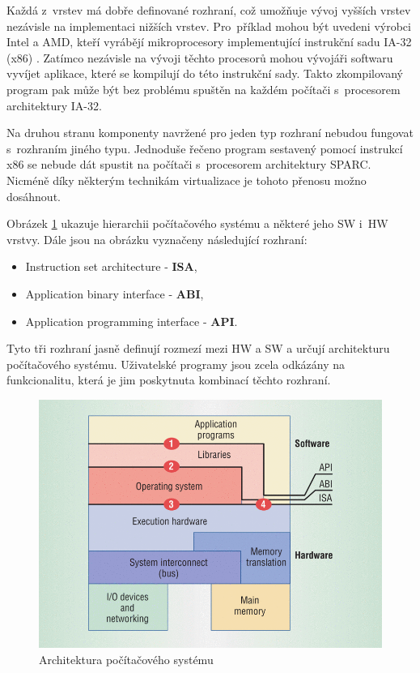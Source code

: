 Každá z~vrstev má dobře definované rozhraní, což umožňuje vývoj vyšších vrstev nezávisle na implementaci nižších vrstev.
Pro~příklad mohou být uvedeni výrobci Intel a AMD, kteří vyrábějí
mikroprocesory implementující instrukční sadu IA-32 (x86) \cite{book:iee:vm_architecture}. Zatímco nezávisle na vývoji
těchto procesorů mohou vývojáři softwaru vyvíjet aplikace, které se kompilují do této instrukční sady. Takto zkompilovaný
program pak může být bez problému spuštěn na každém počítači s~procesorem architektury IA-32.

Na druhou stranu komponenty navržené pro jeden typ rozhraní nebudou fungovat s~rozhraním jiného typu. Jednoduše řečeno program
sestavený pomocí instrukcí x86 se nebude dát spustit na počítači s~procesorem architektury SPARC. Nicméně díky některým technikám
virtualizace je tohoto přenosu možno dosáhnout. 

Obrázek \ref{figure:computer_architecture} ukazuje hierarchii počítačového systému a některé jeho SW i~HW vrstvy. Dále jsou
na obrázku vyznačeny následující rozhraní:
\begin{itemize}
  \item Instruction set architecture - \textbf{ISA},
  \item Application binary interface - \textbf{ABI},
  \item Application programming interface - \textbf{API}.
\end{itemize}
Tyto tři rozhraní jasně definují rozmezí mezi HW a SW a určují architekturu počítačového systému. Uživatelské programy jsou
zcela odkázány na funkcionalitu, která je jim poskytnuta kombinací těchto rozhraní.
\begin{figure}
  \centering
  \includegraphics[scale=0.4]{assets/png/ca.png}
  \caption[Architektura počítačového systému]{Architektura počítačového systému \cite{book:iee:vm_architecture}}
  \label{figure:computer_architecture}
\end{figure}
